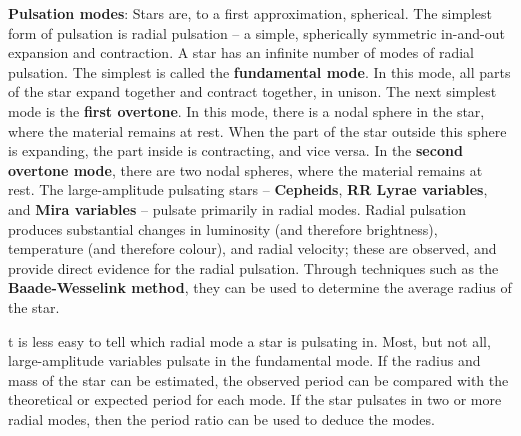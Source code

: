 \documentclass[a4paper,10pt]{article}
\begin{document}
{\noindent}\textbf{Pulsation modes}: Stars are, to a first approximation, spherical. The simplest form of pulsation is radial pulsation -- a simple, spherically symmetric in-and-out expansion and contraction. A star has an infinite number of modes of radial pulsation. The simplest is called the \textbf{fundamental mode}. In this mode, all parts of the star expand together and contract together, in unison. The next simplest mode is the \textbf{first overtone}. In this mode, there is a nodal sphere in the star, where the material remains at rest. When the part of the star outside this sphere is expanding, the part inside is contracting, and vice versa. In the \textbf{second overtone mode}, there are two nodal spheres, where the material remains at rest. The large-amplitude pulsating stars -- \textbf{Cepheids}, \textbf{RR Lyrae variables}, and \textbf{Mira variables} -- pulsate primarily in radial modes. Radial pulsation produces substantial changes in luminosity (and therefore brightness), temperature (and therefore colour), and radial velocity; these are observed, and provide direct evidence for the radial pulsation. Through techniques such as the \textbf{Baade-Wesselink method}, they can be used to determine the average radius of the star.

{\noindent}t is less easy to tell which radial mode a star is pulsating in. Most, but not all, large-amplitude variables pulsate in the fundamental mode. If the radius and mass of the star can be estimated, the observed period can be compared with the theoretical or expected period for each mode. If the star pulsates in two or more radial modes, then the period ratio can be used to deduce the modes.
\end{document}

